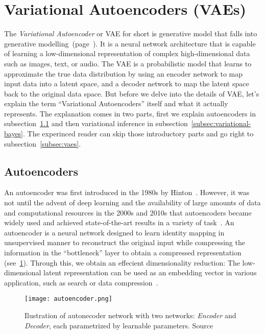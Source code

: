 \section{Variational Autoencoders (VAEs)}
\label{sec:vae}
The \textit{Variational Autoencoder} or VAE for short is generative model that falls into generative modelling~(page~\pageref{generative-modelling}). 
It is a neural network architecture that is capable of learning a low-dimensional representation of complex high-dimensional data such as 
images, text, or audio. The VAE is a probabilistic model that learns to approximate the true data distribution by using an encoder network to 
map input data into a latent space, and a decoder network to map the latent space back to the original data space. But before we delve into the details of VAE, 
let's explain the term ``Variational Autoencoders'' itself and what it actually represents. The explanation comes in two parts, first we explain 
autoencoders in subsection~\ref{subsec:autoencoders} and then variational inference in subsection~\ref{subsec:variational-bayes}. The experinced reader can skip those 
introductory parts and go right to subsection~\ref{subsec:vaes}.

\subsection{Autoencoders}
\label{subsec:autoencoders}
An autoencoder was first introduced in the 1980s by Hinton~\cite{autoencoders-1986}. However, it was not until the advent of deep learning 
and the availability of large amounts of data and computational resources in the 2000s and 2010s that autoencoders became widely used and 
achieved state-of-the-art results in a variety of task~\cite{dim-reduction-ae-2006}. An autoencoder is a neural network designed to learn 
identity mapping in unsupervised manner to reconstruct the original input while compressing the information in the ``bottleneck'' layer 
to obtain a compressed representation (see~\ref{fig:autoencoder}). Through this, we obtain an effecient dimensionality reduction: The low-dimensional 
latent representation can be used as an embedding vector in various application, such as search or data compression~\cite{ae-blog-2018}.

\begin{figure}[t]
    \centering
    \texttt{[image: autoencoder.png]}
    \caption[Autoencoder]{Ilustration of autonecoder network with two networks: \textit{Encoder} and \textit{Decoder}, each parametrized by learnable parameters.
    Source \cite{ae-blog-2018}}
    \label{fig:autoencoder}
\end{figure}

